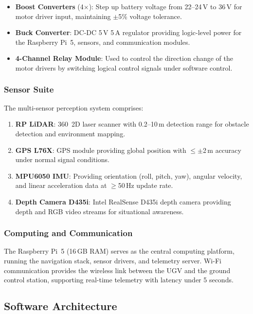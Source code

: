 \documentclass[conference]{IEEEtran}
\begin{document}
\begin{itemize}
    \item \textbf{Boost Converters} (4$\times$): Step up battery voltage from 22--24\,V to 36\,V for motor driver input, maintaining $\pm$5\% voltage tolerance.
    \item \textbf{Buck Converter}: DC-DC 5\,V 5\,A regulator providing logic-level power for the Raspberry Pi~5, sensors, and communication modules.
    \item \textbf{4-Channel Relay Module}: Used to control the direction change of the motor drivers by switching logical control signals under software control.
\end{itemize}

\subsubsection{Sensor Suite}

The multi-sensor perception system comprises:

\begin{enumerate}
    \item \textbf{RP LiDAR}: 360\textdegree\ 2D laser scanner with 0.2--10\,m detection range for obstacle detection and environment mapping.
    \item \textbf{GPS L76X}: GPS module providing global position with $\leq\pm$2\,m accuracy under normal signal conditions.
    \item \textbf{MPU6050 IMU}: Providing orientation (roll, pitch, yaw), angular velocity, and linear acceleration data at $\geq$50\,Hz update rate.
    \item \textbf{Depth Camera D435i}: Intel RealSense D435i depth camera providing depth and RGB video streams for situational awareness.
\end{enumerate}

\subsubsection{Computing and Communication}

The Raspberry Pi~5 (16\,GB RAM) serves as the central computing platform, running the navigation stack, sensor drivers, and telemetry server. Wi-Fi communication provides the wireless link between the UGV and the ground control station, supporting real-time telemetry with latency under 5 seconds.

\subsection{Software Architecture}
\end{document}
